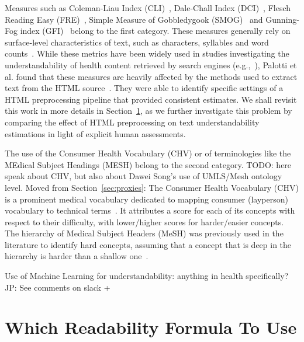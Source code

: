 Measures such as Coleman-Liau Index (CLI)~\cite{cli75}, Dale-Chall Index (DCI)~\cite{dale48}, Flesch Reading Easy (FRE)~\cite{flesch77}, Simple Measure of Gobbledygook (SMOG)~\cite{smog69} and Gunning-Fog index (GFI)~\cite{gunning52} belong to the first category. These measures generally rely on surface-level characteristics of text, such as characters, syllables and word counts~\cite{dubay04}.
While these metrics have been widely used in studies investigating the understandability of health content retrieved by search engines (e.g.,~\cite{becker2004study,graber99readability,fitzsimmons2010readability,wiener2013readability,patel13readability,atcherson14readability,meillier17readability}), Palotti et al. found that these measures are heavily affected by the methods used to extract text from the HTML source~\cite{palotti15}. They were able to identify specific settings of a HTML preprocessing pipeline that provided consistent  estimates. We shall revisit this work in more details in Section~\ref{sec:which_readability}, as we further investigate this problem by comparing the effect of HTML preprocessing on text understandability estimations in light of explicit human assessments. 


The use of the Consumer Health Vocabulary (CHV) or of terminologies like the MEdical Subject Headings (MESH) belong to the second category. TODO: here speak about CHV, but also about Dawei Song's use of UMLS/Mesh ontology level.
Moved from Section~\ref{sec:proxies}:
The Consumer Health Vocabulary (CHV) is a prominent medical vocabulary dedicated to mapping consumer (layperson) vocabulary to technical terms~\cite{zeng06}. 
It attributes a score for each of its concepts with respect to their difficulty, with lower/higher scores for harder/easier concepts.
The hierarchy of Medical Subject Headers (MeSH) was previously used in the literature to identify hard concepts, assuming that a concept that is deep in the hierarchy is harder than a shallow one~\cite{yan11}.


Use of Machine Learning for understandability: anything in health specifically? JP: See comments on slack + \cite{wu13,wu16}

\section{Which Readability Formula To Use}
\label{sec:which_readability}


